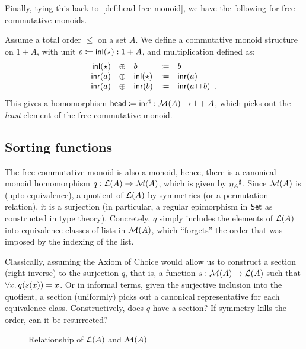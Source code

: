 Finally, tying this back to~\cref{def:head-free-monoid}, we have the following for free commutative monoids.
\begin{definition}
    \label{def:head-free-commutative-monoid}
    Assume a total order $\leq$ on a set $A$.
    We define a commutative monoid structure on $1 + A$,
    with unit \(e \mathrel{\coloneq} \operatorname{\mathsf{inl}}(\star) : 1 + A\), and multiplication defined as:
    \[
        \begin{array}{rclcl}
            \operatorname{\mathsf{inl}}(\star) & \oplus & b          & \mathrel{\coloneq} & b                          \\
            \operatorname{\mathsf{inr}}(a)    & \oplus & \operatorname{\mathsf{inl}}(\star) & \mathrel{\coloneq} & \operatorname{\mathsf{inr}}(a)                    \\
            \operatorname{\mathsf{inr}}(a)    & \oplus & \operatorname{\mathsf{inr}}(b)    & \mathrel{\coloneq} & \operatorname{\mathsf{inr}}(a \sqcap b) \enspace .
        \end{array}
    \]
    This gives a homomorphism \({\operatorname{\mathsf{head}} \mathrel{\coloneq} {\operatorname{\mathsf{inr}}}^{\sharp}} : {\mathcal{M}(A) \to 1 + A}\),
    which picks out the \emph{least} element of the free commutative monoid.
\end{definition}

\subsection{Sorting functions}
\label{sec:sorting}

The free commutative monoid is also a monoid, hence, there is a canonical monoid homomorphism
$q : \mathcal{L}(A) \to \mathcal{M}(A)$, which is given by ${\eta_A}^{\sharp}$.
%
Since $\mathcal{M}(A)$ is (upto equivalence), a quotient of $\mathcal{L}(A)$ by symmetries (or a permutation relation),
it is a surjection (in particular, a regular epimorphism in $\mathsf{Set}$ as constructed in type theory).
%
Concretely, $q$ simply includes the elements of $\mathcal{L}(A)$ into equivalence classes of lists in $\mathcal{M}(A)$,
which ``forgets'' the order that was imposed by the indexing of the list.

Classically, assuming the Axiom of Choice would allow us to construct a section (right-inverse) to the surjection $q$,
that is,
a function $s : \mathcal{M}(A) \to \mathcal{L}(A)$ such that $\forall x.\, q(s(x)) \id x$.
%
Or in informal terms, given the surjective inclusion into the quotient,
a section (uniformly) picks out a canonical representative for each equivalence class.
%
Constructively, does $q$ have a section? If symmetry kills the order, can it be resurrected?
\begin{figure}[H]
    \centering
    \caption{Relationship of $\mathcal{L}(A)$ and $\mathcal{M}(A)$}
    \label{fig:enter-label}
\end{figure}

